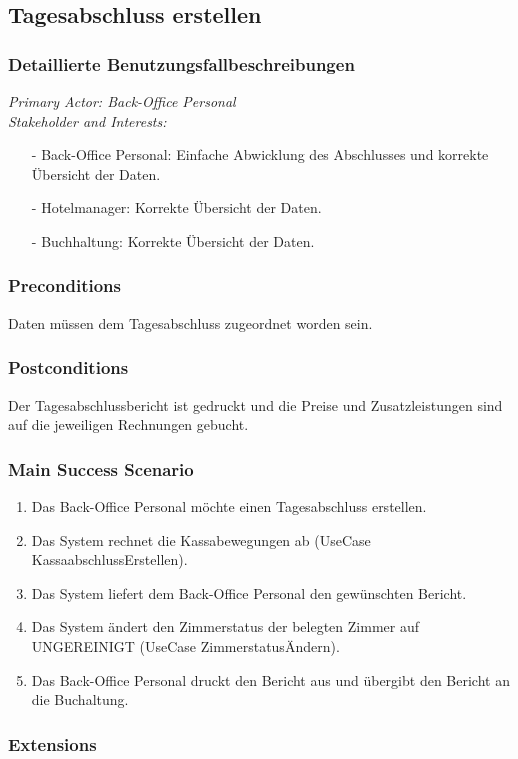 \documentclass[./detailed_overview_usecases.tex]{subfiles}
\begin{document}
    \subsection{Tagesabschluss erstellen}
    \subsubsection{Detaillierte Benutzungsfallbeschreibungen}
    \textit{Primary Actor: Back-Office Personal}
    \\
    \textit{Stakeholder and Interests:}
    \begin{itemize}
        \item[-] Back-Office Personal: Einfache Abwicklung des Abschlusses und korrekte Übersicht der Daten.
        \item[-] Hotelmanager: Korrekte Übersicht der Daten.
        \item[-] Buchhaltung: Korrekte Übersicht der Daten.
    \end{itemize}

    \subsubsection*{Preconditions}
    Daten müssen dem Tagesabschluss zugeordnet worden sein.
    \subsubsection*{Postconditions}
    Der Tagesabschlussbericht ist gedruckt und die Preise und Zusatzleistungen sind auf die jeweiligen Rechnungen gebucht.

    \subsubsection*{Main Success Scenario}
    \begin{enumerate}
        \item Das Back-Office Personal möchte einen Tagesabschluss erstellen.
        \item Das System rechnet die Kassabewegungen ab (UseCase KassaabschlussErstellen).
        \item Das System liefert dem Back-Office Personal den gewünschten Bericht.
        \item Das System ändert den Zimmerstatus der belegten Zimmer auf UNGEREINIGT (UseCase ZimmerstatusÄndern).
        \item Das Back-Office Personal druckt den Bericht aus und übergibt den Bericht an die Buchaltung.
    \end{enumerate}

    \subsubsection*{Extensions}
\end{document}

